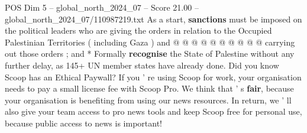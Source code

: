 \begin{textsample}{POS Dim 5 – global\_north\_2024\_07 – Score 21.00 – global\_north\_2024\_07/110987219.txt}
As a start, \textbf{sanctions} must be imposed on the political leaders who are giving the orders in relation to the Occupied Palestinian Territories ( including Gaza ) and @ @ @ @ @ @ @ @ @ @ carrying out those orders ; and * Formally \textbf{recognise} the State of Palestine without any further delay, as 145+ UN member states have already done.
Did you know Scoop has an Ethical Paywall?
If you ' re using Scoop for work, your organisation needs to pay a small license fee with Scoop Pro.
We think that ' s \textbf{fair}, because your organisation is benefiting from using our news resources.
In return, we ' ll also give your team access to pro news tools and keep Scoop free for personal use, because public access to news is important!

\end{textsample}
